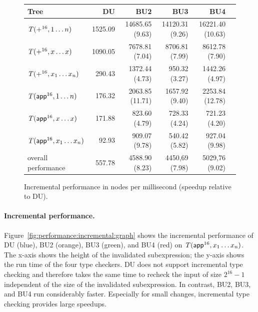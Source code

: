 \documentclass{llncs}
\begin{document}
\begin{figure}[t]
  \centering
  \begin{tabular}[t]{l@{\hskip.5em}r@{\hskip1em}r@{\hskip1em}r@{\hskip1em}r@{\hskip1em}r}
    \toprule
    Tree & DU & BU2 & BU3 & BU4 \\
    \midrule
    {\scriptsize$\mathit{T}({+}^{16},1 \ldots n)$}      & 1525.09  & 14685.65 (9.63)  & 14120.31 (9.26)  & 16221.40 (10.63) \\
    {\scriptsize$\mathit{T}({+}^{16},x \ldots x)$}      &  1090.05  &  7678.81 (7.04)  & 8706.81 (7.99)  &  8612.78 (7.90) \\
    {\scriptsize$\mathit{T}({+}^{16},x_1 \ldots x_n)$}  &  290.43  & 1372.44 (4.73)  & 950.32 (3.27)  & 1442.26 (4.97) \\
    \midrule                          
    {\scriptsize$\mathit{T}({\textsf{app}}^{16},1 \ldots n)$}      &  176.32  & 2063.85 (11.71)  & 1657.92 (9.40) &  2253.84 (12.78) \\
    {\scriptsize$\mathit{T}({\textsf{app}}^{16},x \ldots x)$}      &  171.88  &  823.60 (4.79)  &  728.33 (4.24) &  721.23 (4.20)  \\
    {\scriptsize$\mathit{T}({\textsf{app}}^{16},x_1 \ldots x_n)$}  &   92.93  &  909.07 (9.78)  & 540.42 (5.82) &  927.04 (9.98) \\
    \midrule
    {\scriptsize overall performance} & 557.78 & 4588.90 (8.23) & 4450,69 (7.98) & 5029,76 (9.02) \\
    \bottomrule
  \end{tabular}
  \caption{Incremental performance in nodes per millisecond (speedup relative to
    DU).}
  \label{fig:performance:incremental}
\end{figure}



\paragraph{Incremental performance.}
Figure~\ref{fig:performance:incremental:graph} shows the incremental performance
of DU (blue), BU2 (orange), BU3 (green), and BU4 (red) on
$\mathit{T}({\textsf{app}}^{16},x_1 \dots x_n)$. The x-axis shows the height of the
invalidated subexpression; the y-axis shows the run time of the four type
checkers. DU does not support incremental type checking and therefore takes the
same time to recheck the input of size $2^{16}-1$ independent of the size of the
invalidated subexpression. In contrast, BU2, BU3, and BU4 run considerably
faster. Especially for small changes, incremental type checking provides large
speedups.
\end{document}

